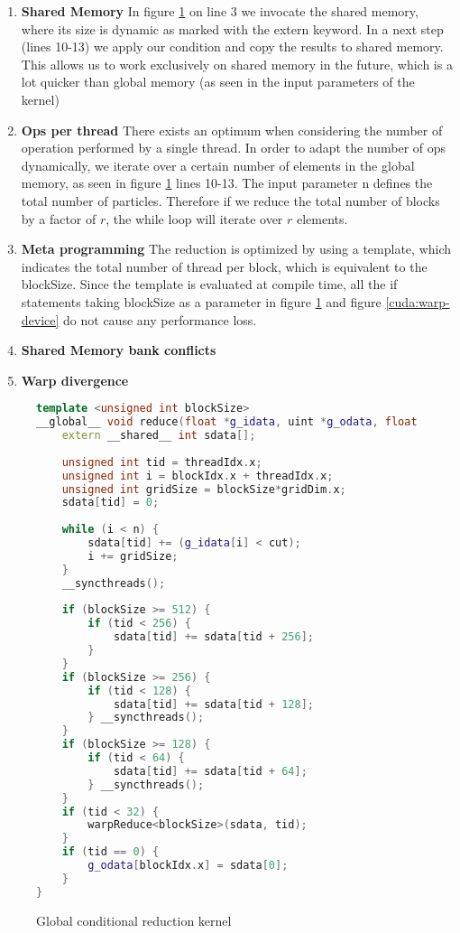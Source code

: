 \documentclass[]{article}
\begin{document}
\begin{enumerate}
	\item \textbf{Shared Memory} 
	In figure \ref{cuda:reduction} on line 3 we invocate the shared memory, where its size is dynamic as marked with the extern keyword. In a next step (lines 10-13) we apply our condition and copy the results to shared memory. This allows us to work exclusively on shared memory in the future, which is a lot quicker than global memory (as seen in the input parameters of the kernel)
	\item \textbf{Ops per thread} There exists an optimum when considering the number of operation performed by a single thread. In order to adapt the number of ops dynamically, we iterate over a certain number of elements in the global memory, as seen in figure \ref{cuda:reduction} lines 10-13. The input parameter n defines the total number of particles. Therefore if we reduce the total number of blocks by a factor of $r$, the while loop will iterate over $r$ elements. 
	\item \textbf{Meta programming} The reduction is optimized by using a template, which indicates the total number of thread per block, which is equivalent to the blockSize. Since the template is evaluated at compile time, all the if statements taking blockSize as a parameter in figure \ref{cuda:reduction} and figure \ref{cuda:warp-device} do not cause any performance loss. 
	\item \textbf{Shared Memory bank conflicts} 
	\item \textbf{Warp divergence}   
\end{enumerate}


\begin{figure}[H]
	
	\begin{lstlisting}[language=c++]
template <unsigned int blockSize>
__global__ void reduce(float *g_idata, uint *g_odata, float cut, int n) {
	extern __shared__ int sdata[];
	
	unsigned int tid = threadIdx.x;
	unsigned int i = blockIdx.x + threadIdx.x;
	unsigned int gridSize = blockSize*gridDim.x;
	sdata[tid] = 0;
	
	while (i < n) {
		sdata[tid] += (g_idata[i] < cut);
		i += gridSize;
	}
	__syncthreads();
	
   	if (blockSize >= 512) {
		if (tid < 256) {
			sdata[tid] += sdata[tid + 256];
		}
	}
	if (blockSize >= 256) {
		if (tid < 128) {
			sdata[tid] += sdata[tid + 128];
		} __syncthreads();
	}
	if (blockSize >= 128) {
		if (tid < 64) {
			sdata[tid] += sdata[tid + 64];
		} __syncthreads();
	}
	if (tid < 32) {
		warpReduce<blockSize>(sdata, tid);
	}
	if (tid == 0) {
		g_odata[blockIdx.x] = sdata[0];
	}
}
	\end{lstlisting}
	\caption{Global conditional reduction kernel}
	\label{cuda:reduction}
\end{figure}
\end{document}

